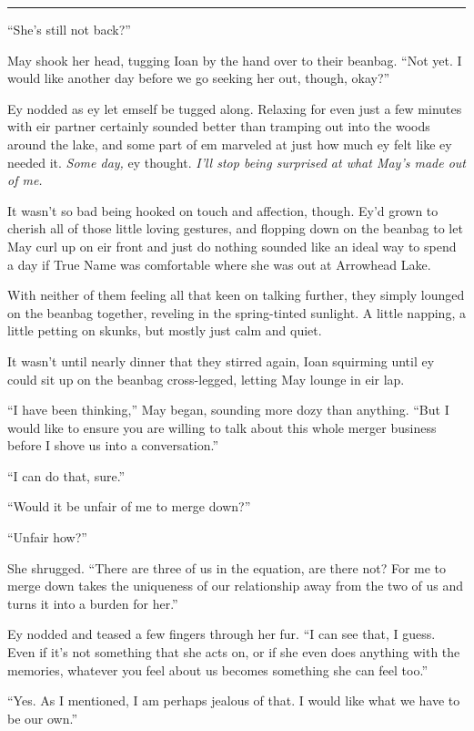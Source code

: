 \begin{center}\rule{0.5\linewidth}{0.5pt}\end{center}

``She's still not back?''

May shook her head, tugging Ioan by the hand over to their beanbag. ``Not yet. I would like another day before we go seeking her out, though, okay?''

Ey nodded as ey let emself be tugged along. Relaxing for even just a few minutes with eir partner certainly sounded better than tramping out into the woods around the lake, and some part of em marveled at just how much ey felt like ey needed it. \emph{Some day,} ey thought. \emph{I'll stop being surprised at what May's made out of me.}

It wasn't so bad being hooked on touch and affection, though. Ey'd grown to cherish all of those little loving gestures, and flopping down on the beanbag to let May curl up on eir front and just do nothing sounded like an ideal way to spend a day if True Name was comfortable where she was out at Arrowhead Lake.

With neither of them feeling all that keen on talking further, they simply lounged on the beanbag together, reveling in the spring-tinted sunlight. A little napping, a little petting on skunks, but mostly just calm and quiet.

It wasn't until nearly dinner that they stirred again, Ioan squirming until ey could sit up on the beanbag cross-legged, letting May lounge in eir lap.

``I have been thinking,'' May began, sounding more dozy than anything. ``But I would like to ensure you are willing to talk about this whole merger business before I shove us into a conversation.''

``I can do that, sure.''

``Would it be unfair of me to merge down?''

``Unfair how?''

She shrugged. ``There are three of us in the equation, are there not? For me to merge down takes the uniqueness of our relationship away from the two of us and turns it into a burden for her.''

Ey nodded and teased a few fingers through her fur. ``I can see that, I guess. Even if it's not something that she acts on, or if she even does anything with the memories, whatever you feel about us becomes something she can feel too.''

``Yes. As I mentioned, I am perhaps jealous of that. I would like what we have to be our own.''

